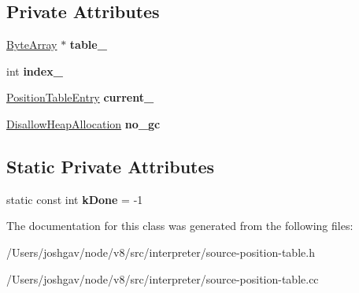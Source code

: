 \subsection*{Private Attributes}
\begin{DoxyCompactItemize}
\item 
\hyperlink{classv8_1_1internal_1_1_byte_array}{Byte\+Array} $\ast$ {\bfseries table\+\_\+}\hypertarget{classv8_1_1internal_1_1interpreter_1_1_source_position_table_iterator_ae6b76f8c652b445a340619434f0384d4}{}\label{classv8_1_1internal_1_1interpreter_1_1_source_position_table_iterator_ae6b76f8c652b445a340619434f0384d4}

\item 
int {\bfseries index\+\_\+}\hypertarget{classv8_1_1internal_1_1interpreter_1_1_source_position_table_iterator_a4a2fae937844d08e49da8ed5ba9a2a92}{}\label{classv8_1_1internal_1_1interpreter_1_1_source_position_table_iterator_a4a2fae937844d08e49da8ed5ba9a2a92}

\item 
\hyperlink{structv8_1_1internal_1_1interpreter_1_1_position_table_entry}{Position\+Table\+Entry} {\bfseries current\+\_\+}\hypertarget{classv8_1_1internal_1_1interpreter_1_1_source_position_table_iterator_a7dac395475a2bcbca94808713c41ffe8}{}\label{classv8_1_1internal_1_1interpreter_1_1_source_position_table_iterator_a7dac395475a2bcbca94808713c41ffe8}

\item 
\hyperlink{classv8_1_1internal_1_1_per_thread_assert_scope_debug_only}{Disallow\+Heap\+Allocation} {\bfseries no\+\_\+gc}\hypertarget{classv8_1_1internal_1_1interpreter_1_1_source_position_table_iterator_ad5a8ce853eed39a923467addc1c56314}{}\label{classv8_1_1internal_1_1interpreter_1_1_source_position_table_iterator_ad5a8ce853eed39a923467addc1c56314}

\end{DoxyCompactItemize}
\subsection*{Static Private Attributes}
\begin{DoxyCompactItemize}
\item 
static const int {\bfseries k\+Done} = -\/1\hypertarget{classv8_1_1internal_1_1interpreter_1_1_source_position_table_iterator_aa1774a0c64685f624ef0cf302d3b3ae7}{}\label{classv8_1_1internal_1_1interpreter_1_1_source_position_table_iterator_aa1774a0c64685f624ef0cf302d3b3ae7}

\end{DoxyCompactItemize}


The documentation for this class was generated from the following files\+:\begin{DoxyCompactItemize}
\item 
/\+Users/joshgav/node/v8/src/interpreter/source-\/position-\/table.\+h\item 
/\+Users/joshgav/node/v8/src/interpreter/source-\/position-\/table.\+cc\end{DoxyCompactItemize}
